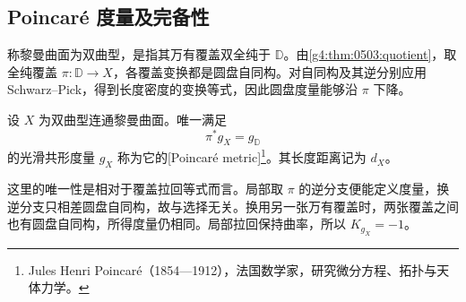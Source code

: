 \subsection{Poincaré 度量及完备性}
\label{g4:subsec:0504:03}

称黎曼曲面为双曲型，是指其万有覆盖双全纯于 \(\mathbb D\)。由\cref{g4:thm:0503:quotient}，取全纯覆盖 \(\pi:\mathbb D\to X\)，各覆盖变换都是圆盘自同构。对自同构及其逆分别应用 Schwarz--Pick，得到长度密度的变换等式，因此圆盘度量能够沿 \(\pi\) 下降。

\begin{definition}
	\label{g4:def:0504:poincare}
	设 \(X\) 为双曲型连通黎曼曲面。唯一满足
	\[
		\pi^*g_X=g_{\mathbb D}
	\]
	的光滑共形度量 \(g_X\) 称为它的[Poincaré metric]\footnote{Jules Henri Poincaré（1854—1912），法国数学家，研究微分方程、拓扑与天体力学。}。其长度距离记为 \(d_X\)。
\end{definition}

这里的唯一性是相对于覆盖拉回等式而言。局部取 \(\pi\) 的逆分支便能定义度量，换逆分支只相差圆盘自同构，故与选择无关。换用另一张万有覆盖时，两张覆盖之间也有圆盘自同构，所得度量仍相同。局部拉回保持曲率，所以 \(K_{g_X}=-1\)。

